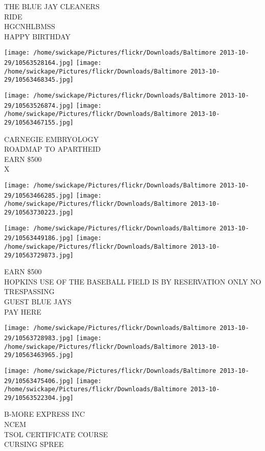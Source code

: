 \documentclass[10pt,letterpaper]{article}
\begin{document}
THE BLUE JAY CLEANERS\\
RIDE\\
HGCNHLBMSS\\
HAPPY BIRTHDAY\\
\pagebreak

\texttt{[image: /home/swickape/Pictures/flickr/Downloads/Baltimore 2013-10-29/10563528164.jpg]}
\texttt{[image: /home/swickape/Pictures/flickr/Downloads/Baltimore 2013-10-29/10563468345.jpg]}

\texttt{[image: /home/swickape/Pictures/flickr/Downloads/Baltimore 2013-10-29/10563526874.jpg]}
\texttt{[image: /home/swickape/Pictures/flickr/Downloads/Baltimore 2013-10-29/10563467155.jpg]}

CARNEGIE EMBRYOLOGY\\
ROADMAP TO APARTHEID\\
EARN \$500\\
X\\
\pagebreak

\texttt{[image: /home/swickape/Pictures/flickr/Downloads/Baltimore 2013-10-29/10563466285.jpg]}
\texttt{[image: /home/swickape/Pictures/flickr/Downloads/Baltimore 2013-10-29/10563730223.jpg]}

\texttt{[image: /home/swickape/Pictures/flickr/Downloads/Baltimore 2013-10-29/10563449186.jpg]}
\texttt{[image: /home/swickape/Pictures/flickr/Downloads/Baltimore 2013-10-29/10563729873.jpg]}

EARN \$500\\
HOPKINS USE OF THE BASEBALL FIELD IS BY RESERVATION ONLY NO TRESPASSING\\
GUEST BLUE JAYS\\
PAY HERE\\
\pagebreak

\texttt{[image: /home/swickape/Pictures/flickr/Downloads/Baltimore 2013-10-29/10563728983.jpg]}
\texttt{[image: /home/swickape/Pictures/flickr/Downloads/Baltimore 2013-10-29/10563463965.jpg]}

\texttt{[image: /home/swickape/Pictures/flickr/Downloads/Baltimore 2013-10-29/10563475406.jpg]}
\texttt{[image: /home/swickape/Pictures/flickr/Downloads/Baltimore 2013-10-29/10563522304.jpg]}

B{-}MORE EXPRESS INC\\
NCEM\\
TSOL CERTIFICATE COURSE\\
CURSING SPREE\\
\pagebreak
\end{document}
